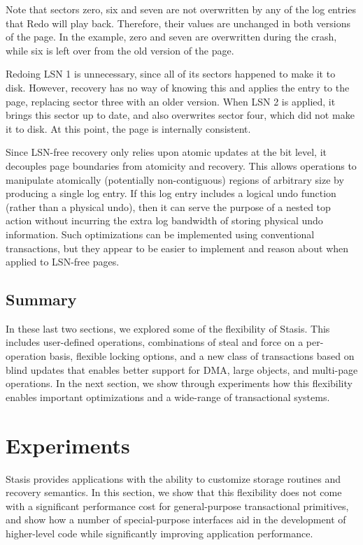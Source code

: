 \documentclass[letterpaper,twocolumn,10pt]{article}
\newcommand{\yad}{Stasis\xspace}
\begin{document}
Note that sectors zero, six and seven are not overwritten by any of
the log entries that Redo will play back.  Therefore, their values are
unchanged in both versions of the page.  In the example, zero and seven 
are overwritten during the crash, while six is left
over from the old version of the page.

Redoing LSN 1 is unnecessary, since all of its sectors happened to
make it to disk.  However, recovery has no way of knowing this and
applies the entry to the page, replacing sector three with an older 
version.  When LSN 2 is applied, it brings this sector up to date,
and also overwrites sector four, which did not make it to
disk.  At this point, the page is internally consistent.

Since LSN-free recovery only relies upon atomic updates at the bit
level, it decouples page boundaries from atomicity and recovery.  This
allows operations to manipulate atomically (potentially
non-contiguous) regions of arbitrary size by producing a single log
entry.  If this log entry includes a logical undo function (rather
than a physical undo), then it can serve the purpose of a nested top
action without incurring the extra log bandwidth of storing physical
undo information.  Such optimizations can be implemented using
conventional transactions, but they appear to be easier to implement
and reason about when applied to LSN-free pages.

\subsection{Summary}

In these last two sections, we explored some of the flexibility of \yad. This
includes user-defined operations, combinations of steal and force on
a per-operation basis, flexible locking options, and a new class of
transactions based on blind updates that enables better support for
DMA, large objects, and multi-page operations.  In the next section,
we show through experiments how this flexibility enables important
optimizations and a wide-range of transactional systems.




\section{Experiments}
\label{experiments}

\yad provides applications with the ability to customize storage
routines and recovery semantics.  In this section, we show that this
flexibility does not come with a significant performance cost for
general-purpose transactional primitives, and show how a number of
special-purpose interfaces aid in the development of higher-level 
code while significantly improving application performance.
\end{document}

